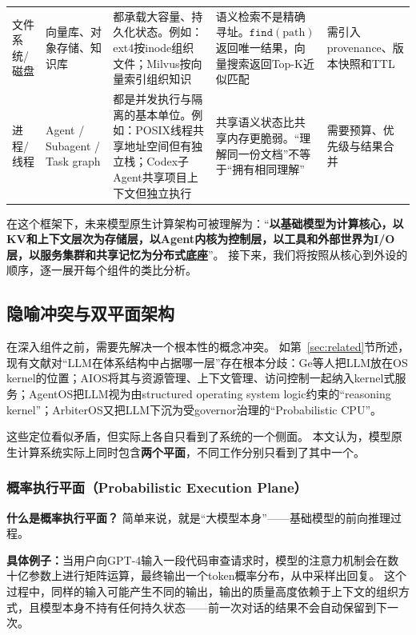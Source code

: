 \documentclass[11pt,a4paper]{article}
\begin{document}
\begin{CJK*}{UTF8}{gbsn}
\begin{table}[t]
\begin{tabularx}{\textwidth}{p{}p{}Y Y Y}
文件系统/磁盘 & 向量库、对象存储、知识库 & 都承载大容量、持久化状态。例如：ext4按inode组织文件；Milvus按向量索引组织知识\cite{lewis2020rag} & 语义检索不是精确寻址。$\texttt{find}(\text{path})$返回唯一结果，向量搜索返回Top-K近似匹配 & 需引入provenance、版本快照和TTL \\
进程/线程 & Agent / Subagent / Task graph & 都是并发执行与隔离的基本单位。例如：POSIX线程共享地址空间但有独立栈；Codex子Agent共享项目上下文但独立执行\cite{openai_codex_subagents_2026} & 共享语义状态比共享内存更脆弱。``理解同一份文档''不等于``拥有相同理解'' & 需要预算、优先级与结果合并 \\
\bottomrule
\end{tabularx}
\end{table}

在这个框架下，未来模型原生计算架构可被理解为：``\textbf{以基础模型为计算核心，以KV和上下文层次为存储层，以Agent内核为控制层，以工具和外部世界为I/O层，以服务集群和共享记忆为分布式底座}''。
接下来，我们将按照从核心到外设的顺序，逐一展开每个组件的类比分析。

\subsection{隐喻冲突与双平面架构}

在深入组件之前，需要先解决一个根本性的概念冲突。
如第~\ref{sec:related}节所述，现有文献对``LLM在体系结构中占据哪一层''存在根本分歧：Ge等人把LLM放在OS kernel的位置\cite{ge2023llmos}；AIOS将其与资源管理、上下文管理、访问控制一起纳入kernel式服务\cite{mei2024aios}；AgentOS把LLM视为由structured operating system logic约束的``reasoning kernel''\cite{agentos2025}；ArbiterOS又把LLM下沉为受governor治理的``Probabilistic CPU''\cite{arbiteros2025}。

这些定位看似矛盾，但实际上各自只看到了系统的一个侧面。
本文认为，模型原生计算系统实际上同时包含\textbf{两个平面}，不同工作分别只看到了其中一个。

\subsubsection{概率执行平面（Probabilistic Execution Plane）}

\textbf{什么是概率执行平面？}
简单来说，就是``大模型本身''——基础模型的前向推理过程。

\textbf{具体例子：}当用户向GPT-4输入一段代码审查请求时，模型的注意力机制会在数十亿参数上进行矩阵运算，最终输出一个token概率分布，从中采样出回复。
这个过程中，同样的输入可能产生不同的输出，输出的质量高度依赖于上下文的组织方式，且模型本身不持有任何持久状态——前一次对话的结果不会自动保留到下一次。


\end{CJK*}
\end{document}
